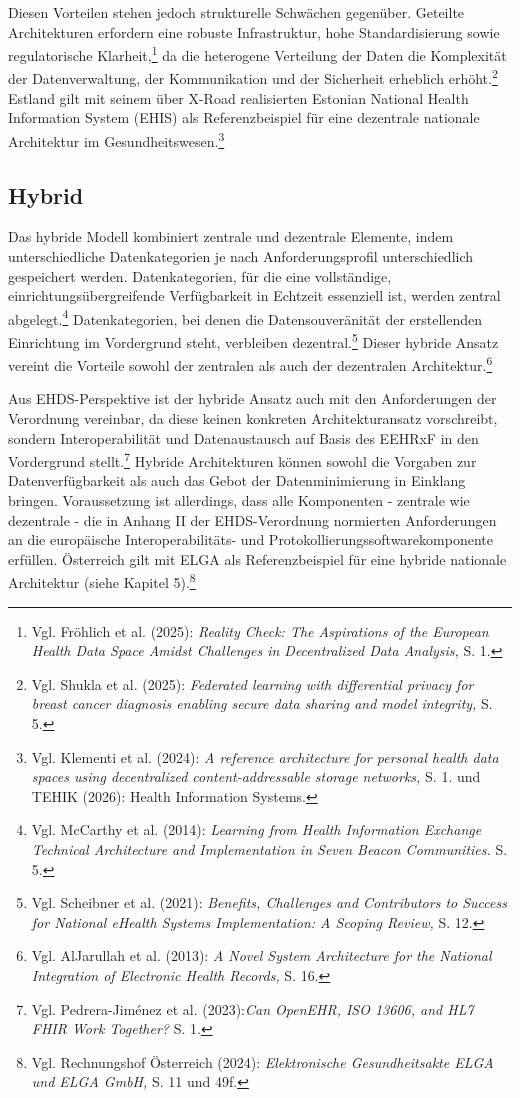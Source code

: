 Diesen Vorteilen stehen jedoch strukturelle Schwächen gegenüber. Geteilte Architekturen erfordern eine robuste Infrastruktur, hohe Standardisierung sowie regulatorische Klarheit,\footnote{Vgl. Fröhlich et al. (2025): \textit{Reality Check: The Aspirations of the European Health Data Space Amidst Challenges in Decentralized Data Analysis,} S. 1.} da die heterogene Verteilung der Daten die Komplexität der Datenverwaltung, der Kommunikation und der Sicherheit erheblich erhöht.\footnote{Vgl. Shukla et al. (2025): \textit{Federated learning with differential privacy for breast cancer diagnosis enabling secure data sharing and model integrity,} S. 5.}
Estland gilt mit seinem über X-Road realisierten Estonian National Health Information System (EHIS) als Referenzbeispiel für eine dezentrale nationale Architektur im Gesundheitswesen.\footnote{Vgl. Klementi et al. (2024): \textit{A reference architecture for personal health data spaces using decentralized content-addressable storage networks,} S. 1. und TEHIK (2026): Health Information Systems.}

    \subsection{Hybrid}
Das hybride Modell kombiniert zentrale und dezentrale Elemente, indem unterschiedliche Datenkategorien je nach Anforderungsprofil unterschiedlich gespeichert werden. Datenkategorien, für die eine vollständige, einrichtungsübergreifende Verfügbarkeit in Echtzeit essenziell ist, werden zentral abgelegt.\footnote{Vgl. McCarthy et al. (2014): \textit{Learning from Health Information Exchange Technical Architecture and Implementation in Seven Beacon Communities.} S. 5.} Datenkategorien, bei denen die Datensouveränität der erstellenden Einrichtung im Vordergrund steht, verbleiben dezentral.\footnote{Vgl. Scheibner et al. (2021): \textit{Benefits, Challenges and Contributors to Success for National eHealth Systems Implementation: A Scoping Review,} S. 12.} Dieser hybride Ansatz vereint die Vorteile sowohl der zentralen als auch der dezentralen Architektur.\footnote{Vgl. AlJarullah et al. (2013):  \textit{A Novel System Architecture for the National Integration of Electronic Health Records,} S. 16.}

Aus EHDS-Perspektive ist der hybride Ansatz auch mit den Anforderungen der Verordnung vereinbar, da diese keinen konkreten Architekturansatz vorschreibt, sondern Interoperabilität und Datenaustausch auf Basis des EEHRxF in den Vordergrund stellt.\footnote{Vgl. Pedrera-Jiménez et al. (2023):\textit{Can OpenEHR, ISO 13606, and HL7 FHIR Work Together?} S. 1.}
Hybride Architekturen können sowohl die Vorgaben zur Datenverfügbarkeit als auch das Gebot der Datenminimierung in Einklang bringen. Voraussetzung ist allerdings, dass alle Komponenten - zentrale wie dezentrale - die in Anhang II der EHDS-Verordnung normierten Anforderungen an die europäische Interoperabilitäts- und Protokollierungssoftwarekomponente erfüllen. Österreich gilt mit ELGA als Referenzbeispiel für eine hybride nationale Architektur (siehe Kapitel 5).\footnote{Vgl. Rechnungshof Österreich (2024): \textit{Elektronische Gesundheitsakte ELGA und ELGA GmbH,} S. 11 und 49f.}

